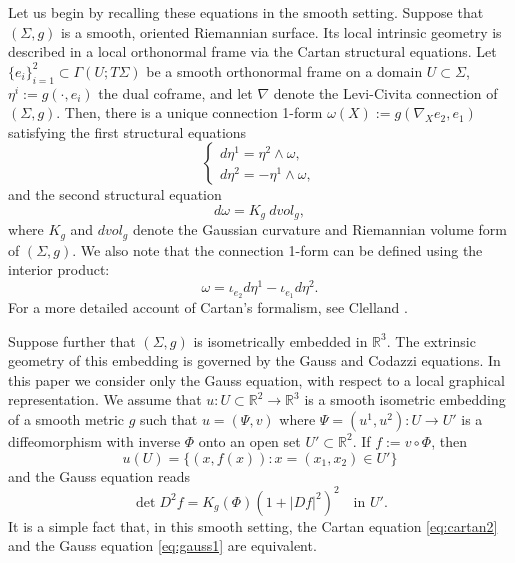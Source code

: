\documentclass[12pt]{article}
\newcommand{\R}{\mathbb{R}}
\theoremstyle{plain}
\numberwithin{equation}{section}
\begin{document}
Let us begin by recalling these equations in the smooth setting. Suppose that $(\Sigma,g)$ is a smooth, oriented Riemannian surface. Its local intrinsic geometry is described in a local orthonormal frame via the Cartan structural equations. Let $\{e_i\}_{i=1}^2 \subset \Gamma(U;T\Sigma)$ be a smooth orthonormal frame on a domain $U \subset \Sigma$, $\eta^i := g(\cdot, e_i)$ the dual coframe, and let $\nabla$ denote the Levi-Civita connection of $(\Sigma,g)$. Then, there is a unique connection 1-form $\omega(X) := g(\nabla_X e_2,e_1)$ satisfying the first structural equations
\begin{equation} \label{eq:cartan1}
    \begin{cases}
        d\eta^1 = \eta^2 \wedge \omega,\\
        d\eta^2 = -\eta^1 \wedge \omega,
    \end{cases}
\end{equation}
and the second structural equation
\begin{equation} \label{eq:cartan2}
    d\omega = K_g ~dvol_g,
\end{equation}
where $K_g$ and $dvol_g$ denote the Gaussian curvature and Riemannian volume form of $(\Sigma,g)$. We also note that the connection 1-form can be defined using the interior product:
\begin{equation} \label{eq:conn_form_formula}
    \omega = \iota_{e_2}d\eta^1 - \iota_{e_1}d\eta^2.
\end{equation}
For a more detailed account of Cartan's formalism, see Clelland \cite{clelland_17}.

Suppose further that $(\Sigma, g)$ is isometrically embedded in $\R^3$. The extrinsic geometry of this embedding is governed by the Gauss and Codazzi equations. In this paper we consider only the Gauss equation, with respect to a local graphical representation. We assume that $u : U \subset \R^2 \to \R^3$ is a smooth isometric embedding of a smooth metric $g$ such that $u = (\Psi,v)$ where $\Psi = (u^1,u^2) : U \to U'$ is a diffeomorphism with inverse $\Phi$ onto an open set $U' \subset \R^2$. If $f := v \circ \Phi$, then
\begin{equation*}
    u(U) = \{(x,f(x)) : x = (x_1,x_2) \in U'\}
\end{equation*}
and the Gauss equation reads
\begin{equation} \label{eq:gauss1}
    \det D^2 f = K_g(\Phi)(1+|Df|^2)^2 \quad \text{in } U'.
\end{equation}
It is a simple fact that, in this smooth setting, the Cartan equation \eqref{eq:cartan2} and the Gauss equation \eqref{eq:gauss1} are equivalent.
\end{document}
